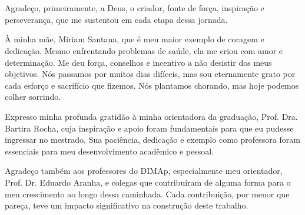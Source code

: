 \chapter*{\agradecimentosnome}

Agradeço, primeiramente, a Deus, o criador, fonte de força, inspiração e perseverança, que me sustentou em cada etapa dessa jornada.

À minha mãe, Miriam Santana, que é meu maior exemplo de coragem e dedicação. Mesmo enfrentando problemas de saúde, ela me criou com amor e determinação. Me deu força, conselhos e incentivo a não desistir dos meus objetivos. Nós passamos por muitos dias difíceis, mas sou eternamente grato por cada esforço e sacrifício que fizemos. Nós plantamos chorando, mas hoje podemos colher sorrindo.

Expresso minha profunda gratidão à minha orientadora da graduação, Prof. Dra. Bartira Rocha, cuja inspiração e apoio foram fundamentais para que eu pudesse ingressar no mestrado. Sua paciência, dedicação e exemplo como professora foram essenciais para meu desenvolvimento acadêmico e pessoal.

Agradeço também aos professores do DIMAp, especialmente meu orientador, Prof. Dr. Eduardo Aranha, e colegas que contribuíram de alguma forma para o meu crescimento ao longo dessa caminhada. Cada contribuição, por menor que pareça, teve um impacto significativo na construção deste trabalho.

\newpage
